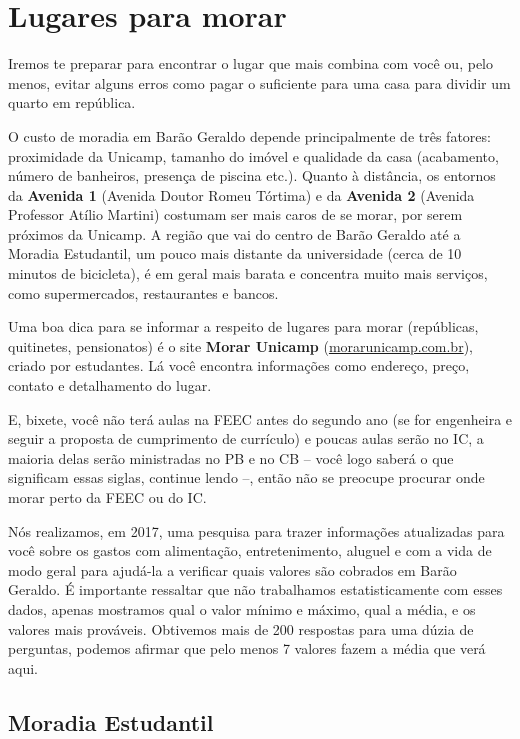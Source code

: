 
\section{Lugares para morar}

Iremos te preparar para encontrar o lugar que mais combina com você ou, pelo
menos, evitar alguns erros como pagar o suficiente para uma casa para dividir
um quarto em república.

O custo de moradia em Barão Geraldo depende principalmente de três fatores:
proximidade da Unicamp, tamanho do imóvel e qualidade da casa (acabamento,
número de banheiros, presença de piscina etc.). Quanto à distância, os entornos
da \textbf{Avenida 1} (Avenida Doutor Romeu Tórtima) e da \textbf{Avenida 2}
(Avenida Professor Atílio Martini) costumam ser mais caros de se morar, por
serem próximos da Unicamp. A região que vai do centro de Barão Geraldo até a
Moradia Estudantil, um pouco mais distante da universidade (cerca de 10 minutos
de bicicleta), é em geral mais barata e concentra muito mais serviços, como
supermercados, restaurantes e bancos.

Uma boa dica para se informar a respeito de lugares para morar (repúblicas,
quitinetes, pensionatos) é o site \textbf{Morar Unicamp}
(\url{morarunicamp.com.br}), criado por estudantes. Lá você encontra
informações como endereço, preço, contato e detalhamento do lugar.

E, bixete, você não terá aulas na FEEC antes do segundo ano (se for engenheira
e seguir a proposta de cumprimento de currículo) e poucas aulas serão no IC, a
maioria delas serão ministradas no PB e no CB -- você logo saberá o que
significam essas siglas, continue lendo --, então não se preocupe procurar onde
morar perto da FEEC ou do IC.

Nós realizamos, em 2017, uma pesquisa para trazer informações atualizadas para
você sobre os gastos com alimentação, entretenimento, aluguel e com a vida de
modo geral para ajudá-la a verificar quais valores são cobrados em Barão
Geraldo. É importante ressaltar que não trabalhamos estatisticamente com esses
dados, apenas mostramos qual o valor mínimo e máximo, qual a média, e os
valores mais prováveis. Obtivemos mais de 200 respostas para uma dúzia de
perguntas, podemos afirmar que pelo menos 7 valores fazem a média que verá
aqui.

\subsection{Moradia Estudantil}

